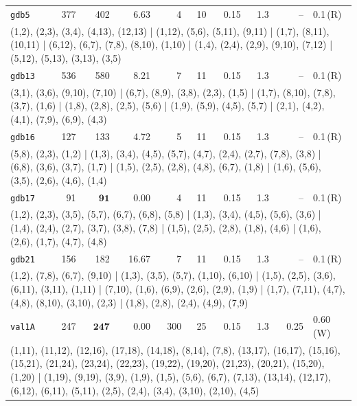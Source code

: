 \begin{longtable}{lrrrrrrrrl}
\texttt{gdb5} & 377 & 402 & 6.63 & 4 & 10 & 0.15 & 1.3 & -- & 0.1\,(R) \\
\multicolumn{10}{p{0.96\linewidth}}{\tiny\raggedright\arraybackslash (1,2), (2,3), (3,4), (4,13), (12,13) | (1,12), (5,6), (5,11), (9,11) | (1,7), (8,11), (10,11) | (6,12), (6,7), (7,8), (8,10), (1,10) | (1,4), (2,4), (2,9), (9,10), (7,12) | (5,12), (5,13), (3,13), (3,5)} \\[2pt]
\texttt{gdb13} & 536 & 580 & 8.21 & 7 & 11 & 0.15 & 1.3 & -- & 0.1\,(R) \\
\multicolumn{10}{p{0.96\linewidth}}{\tiny\raggedright\arraybackslash (3,1), (3,6), (9,10), (7,10) | (6,7), (8,9), (3,8), (2,3), (1,5) | (1,7), (8,10), (7,8), (3,7), (1,6) | (1,8), (2,8), (2,5), (5,6) | (1,9), (5,9), (4,5), (5,7) | (2,1), (4,2), (4,1), (7,9), (6,9), (4,3)} \\[2pt]
\texttt{gdb16} & 127 & 133 & 4.72 & 5 & 11 & 0.15 & 1.3 & -- & 0.1\,(R) \\
\multicolumn{10}{p{0.96\linewidth}}{\tiny\raggedright\arraybackslash (5,8), (2,3), (1,2) | (1,3), (3,4), (4,5), (5,7), (4,7), (2,4), (2,7), (7,8), (3,8) | (6,8), (3,6), (3,7), (1,7) | (1,5), (2,5), (2,8), (4,8), (6,7), (1,8) | (1,6), (5,6), (3,5), (2,6), (4,6), (1,4)} \\[2pt]
\texttt{gdb17} & 91 & $\mathbf{91}$ & 0.00 & 4 & 11 & 0.15 & 1.3 & -- & 0.1\,(R) \\
\multicolumn{10}{p{0.96\linewidth}}{\tiny\raggedright\arraybackslash (1,2), (2,3), (3,5), (5,7), (6,7), (6,8), (5,8) | (1,3), (3,4), (4,5), (5,6), (3,6) | (1,4), (2,4), (2,7), (3,7), (3,8), (7,8) | (1,5), (2,5), (2,8), (1,8), (4,6) | (1,6), (2,6), (1,7), (4,7), (4,8)} \\[2pt]
\texttt{gdb21} & 156 & 182 & 16.67 & 7 & 11 & 0.15 & 1.3 & -- & 0.1\,(R) \\
\multicolumn{10}{p{0.96\linewidth}}{\tiny\raggedright\arraybackslash (1,2), (7,8), (6,7), (9,10) | (1,3), (3,5), (5,7), (1,10), (6,10) | (1,5), (2,5), (3,6), (6,11), (3,11), (1,11) | (7,10), (1,6), (6,9), (2,6), (2,9), (1,9) | (1,7), (7,11), (4,7), (4,8), (8,10), (3,10), (2,3) | (1,8), (2,8), (2,4), (4,9), (7,9)} \\[2pt]
\texttt{val1A} & 247 & $\mathbf{247}$ & 0.00 & 300 & 25 & 0.15 & 1.3 & 0.25 & 0.60\,(W) \\
\multicolumn{10}{p{0.96\linewidth}}{\tiny\raggedright\arraybackslash (1,11), (11,12), (12,16), (17,18), (14,18), (8,14), (7,8), (13,17), (16,17), (15,16), (15,21), (21,24), (23,24), (22,23), (19,22), (19,20), (21,23), (20,21), (15,20), (1,20) | (1,19), (9,19), (3,9), (1,9), (1,5), (5,6), (6,7), (7,13), (13,14), (12,17), (6,12), (6,11), (5,11), (2,5), (2,4), (3,4), (3,10), (2,10), (4,5)} \\[2pt]

\end{longtable}
